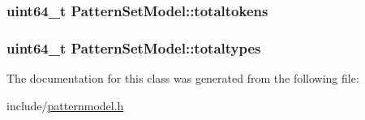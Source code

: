 \subsubsection[{totaltokens}]{\setlength{\rightskip}{0pt plus 5cm}uint64\+\_\+t Pattern\+Set\+Model\+::totaltokens\hspace{0.3cm}{\ttfamily [protected]}}\label{classPatternSetModel_ae64f1edc5d72066d8cc6fbb80422518b}
\hypertarget{classPatternSetModel_ac7aeed2a7d78ef5883ba38618a3e49a7}{}
\subsubsection[{totaltypes}]{\setlength{\rightskip}{0pt plus 5cm}uint64\+\_\+t Pattern\+Set\+Model\+::totaltypes\hspace{0.3cm}{\ttfamily [protected]}}\label{classPatternSetModel_ac7aeed2a7d78ef5883ba38618a3e49a7}


The documentation for this class was generated from the following file\+:\begin{DoxyCompactItemize}
\item 
include/\hyperlink{patternmodel_8h}{patternmodel.\+h}\end{DoxyCompactItemize}
